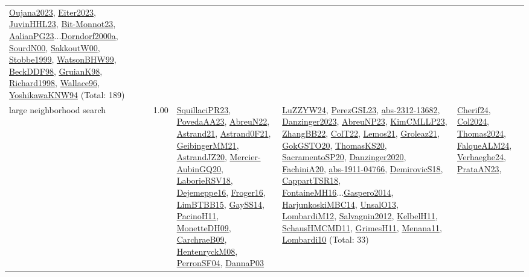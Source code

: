 {\begin{longtable}{p{3cm}r>{\raggedright\arraybackslash}p{6cm}>{\raggedright\arraybackslash}p{6cm}>{\raggedright\arraybackslash}p{8cm}}
\hyperref[detail:Oujana2023]{Oujana2023}, \hyperref[detail:Eiter2023]{Eiter2023}, \hyperref[detail:JuvinHHL23]{JuvinHHL23}, \hyperref[detail:Bit-Monnot23]{Bit-Monnot23}, \hyperref[detail:AalianPG23]{AalianPG23}...\hyperref[detail:Dorndorf2000a]{Dorndorf2000a}, \hyperref[detail:SourdN00]{SourdN00}, \hyperref[detail:SakkoutW00]{SakkoutW00}, \hyperref[detail:Stobbe1999]{Stobbe1999}, \hyperref[detail:WatsonBHW99]{WatsonBHW99}, \hyperref[detail:BeckDDF98]{BeckDDF98}, \hyperref[detail:GruianK98]{GruianK98}, \hyperref[detail:Richard1998]{Richard1998}, \hyperref[detail:Wallace96]{Wallace96}, \hyperref[detail:YoshikawaKNW94]{YoshikawaKNW94} (Total: 189)\\
\index{large neighborhood search}\index{Algorithms!large neighborhood search}large neighborhood search &  1.00 & \hyperref[detail:SquillaciPR23]{SquillaciPR23}, \hyperref[detail:PovedaAA23]{PovedaAA23}, \hyperref[detail:AbreuN22]{AbreuN22}, \hyperref[detail:Astrand21]{Astrand21}, \hyperref[detail:Astrand0F21]{Astrand0F21}, \hyperref[detail:GeibingerMM21]{GeibingerMM21}, \hyperref[detail:AstrandJZ20]{AstrandJZ20}, \hyperref[detail:Mercier-AubinGQ20]{Mercier-AubinGQ20}, \hyperref[detail:LaborieRSV18]{LaborieRSV18}, \hyperref[detail:Dejemeppe16]{Dejemeppe16}, \hyperref[detail:Froger16]{Froger16}, \hyperref[detail:LimBTBB15]{LimBTBB15}, \hyperref[detail:GaySS14]{GaySS14}, \hyperref[detail:PacinoH11]{PacinoH11}, \hyperref[detail:MonetteDH09]{MonetteDH09}, \hyperref[detail:CarchraeB09]{CarchraeB09}, \hyperref[detail:HentenryckM08]{HentenryckM08}, \hyperref[detail:PerronSF04]{PerronSF04}, \hyperref[detail:DannaP03]{DannaP03} & \hyperref[detail:LuZZYW24]{LuZZYW24}, \hyperref[detail:PerezGSL23]{PerezGSL23}, \hyperref[detail:abs-2312-13682]{abs-2312-13682}, \hyperref[detail:Danzinger2023]{Danzinger2023}, \hyperref[detail:AbreuNP23]{AbreuNP23}, \hyperref[detail:KimCMLLP23]{KimCMLLP23}, \hyperref[detail:ZhangBB22]{ZhangBB22}, \hyperref[detail:ColT22]{ColT22}, \hyperref[detail:Lemos21]{Lemos21}, \hyperref[detail:Groleaz21]{Groleaz21}, \hyperref[detail:GokGSTO20]{GokGSTO20}, \hyperref[detail:ThomasKS20]{ThomasKS20}, \hyperref[detail:SacramentoSP20]{SacramentoSP20}, \hyperref[detail:Danzinger2020]{Danzinger2020}, \hyperref[detail:FachiniA20]{FachiniA20}, \hyperref[detail:abs-1911-04766]{abs-1911-04766}, \hyperref[detail:DemirovicS18]{DemirovicS18}, \hyperref[detail:CappartTSR18]{CappartTSR18}, \hyperref[detail:FontaineMH16]{FontaineMH16}...\hyperref[detail:Gaspero2014]{Gaspero2014}, \hyperref[detail:HarjunkoskiMBC14]{HarjunkoskiMBC14}, \hyperref[detail:UnsalO13]{UnsalO13}, \hyperref[detail:LombardiM12]{LombardiM12}, \hyperref[detail:Salvagnin2012]{Salvagnin2012}, \hyperref[detail:KelbelH11]{KelbelH11}, \hyperref[detail:SchausHMCMD11]{SchausHMCMD11}, \hyperref[detail:GrimesH11]{GrimesH11}, \hyperref[detail:Menana11]{Menana11}, \hyperref[detail:Lombardi10]{Lombardi10} (Total: 33) & \hyperref[detail:Cherif24]{Cherif24}, \hyperref[detail:Col2024]{Col2024}, \hyperref[detail:Thomas2024]{Thomas2024}, \hyperref[detail:FalqueALM24]{FalqueALM24}, \hyperref[detail:Verhaeghe24]{Verhaeghe24}, \hyperref[detail:PrataAN23]{PrataAN23}, 
\end{longtable}}
